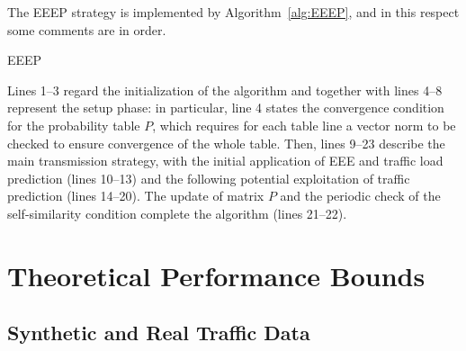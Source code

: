 \documentclass[journal,10pt,twoside,final]{IEEEtran}
\begin{document}
The EEEP strategy is implemented by Algorithm~\ref{alg:EEEP}, and in this respect some comments are in order.

\begin{algorithm}[ht]
 \caption{EEEP}
 \begin{algorithmic}[1]
 \STATE {Partition $T$ in ${\cal T}_1=\left[0,T^\prime\right)$ and ${\cal T}_2=\left[T^\prime, T\right)$}
 \ENDWHILE 	
       \ENDWHILE
  \ELSE 
 \ENDIF 
{}
 \ENDWHILE
 \end{algorithmic}
 \label{alg:EEEP}
\end{algorithm}
 
Lines 1--3 regard the initialization of the algorithm and together with lines 4--8 represent the setup phase: in particular, line 4 states the convergence condition for the probability table $P$, which requires for each table line a vector norm to be checked to ensure convergence of the whole table. 
Then, lines 9--23 describe the main transmission strategy, with the initial application of EEE and traffic load prediction (lines 10--13) and the following potential exploitation of traffic prediction (lines 14--20).
The update of matrix $P$ and the periodic check of the self-similarity condition complete the algorithm (lines 21--22).


\section{Theoretical Performance Bounds}
\label{discussion}

\subsection{Synthetic and Real Traffic Data}
\label{sec:synth&real}
\end{document}
